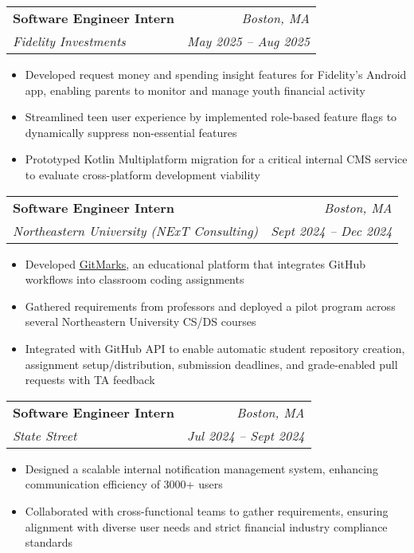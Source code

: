 \documentclass[letterpaper,11pt]{article}
\makeatletter
\newcommand{\resumeItem}[1]{
  \item\small{
    {#1 \vspace{-2.pt}}
  }
}
\newcommand{\resumeSubheading}[4]{
  \vspace{-3pt}\item
    \begin{tabular*}{0.97\textwidth}[t]{l@{\extracolsep{\fill}}r}
    \vspace{-2pt}
      \textbf{#1} & \textit{#2} \\
      \textit{\small#3} & \textit{\small #4} \\
    \end{tabular*}\vspace{-7pt}
}
\newcommand{\resumeItemListStart}{\begin{itemize}}
\newcommand{\resumeItemListEnd}{\end{itemize}\vspace{-5pt}}
\makeatother
\begin{document}
  \resumeSubheading
      {Software Engineer Intern}{Boston, MA}
      {Fidelity Investments}{May 2025 -- Aug 2025}
      \resumeItemListStart
            \resumeItem{Developed request money and spending insight features for Fidelity's Android app, enabling parents to monitor and manage youth financial activity}
            \resumeItem{Streamlined teen user experience by implemented role-based feature flags to dynamically suppress non-essential features}
            \resumeItem{Prototyped Kotlin Multiplatform migration for a critical internal CMS service to evaluate cross-platform development viability}
        \resumeItemListEnd
    \vspace{4pt}

    \resumeSubheading
        {Software Engineer Intern}{Boston, MA}
        {Northeastern University (NExT Consulting)}{Sept 2024 -- Dec 2024}
        \resumeItemListStart
            \resumeItem{Developed \href{https://github.com/NUSpecialProjects/gitmarks}{\underline{GitMarks}}, an educational platform that integrates GitHub workflows into classroom coding assignments}
            \resumeItem{Gathered requirements from professors and deployed a pilot program across several Northeastern University CS/DS courses}
            \resumeItem{Integrated with GitHub API to enable automatic student repository creation, assignment setup/distribution, submission deadlines, and grade-enabled pull requests with TA feedback}
        \resumeItemListEnd
    \vspace{1pt}

    \resumeSubheading
      {Software Engineer Intern}{Boston, MA}
      {State Street}{Jul 2024 -- Sept 2024}
      \resumeItemListStart
        \resumeItem{Designed a scalable internal notification management system, enhancing communication efficiency of 3000+ users}
        \resumeItem{Collaborated with cross-functional teams to gather requirements, ensuring alignment with diverse user needs and strict financial industry compliance standards}
      \resumeItemListEnd
    \vspace{1pt}
    
\end{document}
